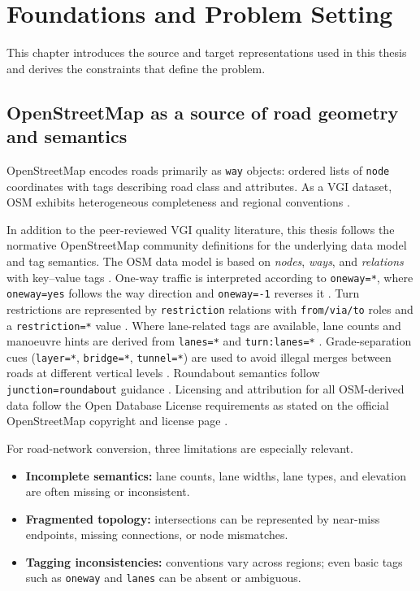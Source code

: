 \section{Foundations and Problem Setting}
\label{sec:foundations}

This chapter introduces the source and target representations used in this thesis and derives the constraints that define the problem.

\subsection{OpenStreetMap as a source of road geometry and semantics}
OpenStreetMap encodes roads primarily as \texttt{way} objects: ordered lists of \texttt{node} coordinates with tags describing road class and attributes. As a VGI dataset, OSM exhibits heterogeneous completeness and regional conventions \cite{goodchild2007vgi,haklay2010osm}.

In addition to the peer-reviewed VGI quality literature, this thesis follows the normative OpenStreetMap community definitions for the underlying data model and tag semantics. The OSM data model is based on \emph{nodes}, \emph{ways}, and \emph{relations} with key--value tags \cite{osm_elements,osm_map_features}. One-way traffic is interpreted according to \texttt{oneway=*}, where \texttt{oneway=yes} follows the way direction and \texttt{oneway=-1} reverses it \cite{osm_oneway}. Turn restrictions are represented by \texttt{restriction} relations with \texttt{from/via/to} roles and a \texttt{restriction=*} value \cite{osm_restriction}. Where lane-related tags are available, lane counts and manoeuvre hints are derived from \texttt{lanes=*} and \texttt{turn:lanes=*} \cite{osm_lanes,osm_turn_lanes}. Grade-separation cues (\texttt{layer=*}, \texttt{bridge=*}, \texttt{tunnel=*}) are used to avoid illegal merges between roads at different vertical levels \cite{osm_layer,osm_bridge,osm_tunnel}. Roundabout semantics follow \texttt{junction=roundabout} guidance \cite{osm_junction_roundabout}. Licensing and attribution for all OSM-derived data follow the Open Database License requirements as stated on the official OpenStreetMap copyright and license page \cite{osm_copyright}.

 For road-network conversion, three limitations are especially relevant.

\begin{itemize}
\item \textbf{Incomplete semantics:} lane counts, lane widths, lane types, and elevation are often missing or inconsistent.
\item \textbf{Fragmented topology:} intersections can be represented by near-miss endpoints, missing connections, or node mismatches.
\item \textbf{Tagging inconsistencies:} conventions vary across regions; even basic tags such as \texttt{oneway} and \texttt{lanes} can be absent or ambiguous.
\end{itemize}

